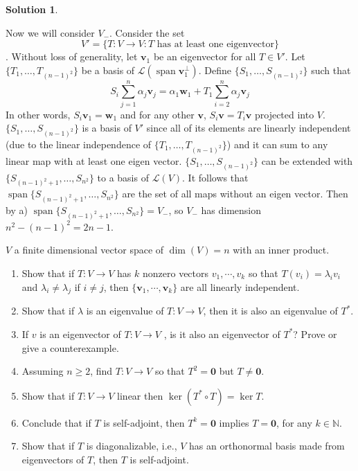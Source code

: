 \documentclass[11pt]{article}
\theoremstyle{definition}
\newenvironment{customex}[1]
  {\renewcommand\theinnercustomex{#1}\innercustomex}
  {\endinnercustomex}
\newtheorem*{solution}{Solution}
\newcommand{\N}{\mathbb{N}}
\DeclareMathOperator{\spn}{span}
\newcommand{\vv}{\mathbf{v}}
\newcommand{\vw}{\mathbf{w}}
\newcommand{\vzero}{\mathbf{0}}
\newcommand{\Lagr}{\mathcal{L}}
\begin{document}
\begin{solution}
\begin{enumerate}[label = \alph*)]
            Now we will consider $V_-$. Consider the set $$V' = \{T:V \to V: T \text{ has at least one eigenvector} \}$$. Without loss of generality, let $\vv_1$ be an eigenvector for all $T \in V'$. Let $\{T_1, \dots, T_{(n-1)^2}\}$ be a basis of $\Lagr(\spn\vv_1^{\perp})$. Define $\{S_1, \dots, S_{(n-1)^2}\}$ such that $$S_i \sum_{j = 1}^n \alpha_j \vv_j = \alpha_1 \vw_1 + T_1 \sum_{i=2}^n \alpha_j \vv_j$$In other words, $S_i\vv_1 = \vw_1$ and for any other $\vv$, $S_i\vv = T_i\vv$ projected into $V$. $\{S_1, \dots, S_{(n-1)^2}\}$ is a basis of $V'$ since all of its elements are linearly independent (due to the linear independence of $\{T_1, \dots, T_{(n-1)^2}\}$) and it can sum to any linear map with at least one eigen vector. $\{S_1, \dots, S_{(n-1)^2}\}$ can be extended with $\{S_{(n-1)^2 + 1}, \dots, S_{n^2}\}$ to a basis of $\Lagr(V)$. It follows that $\spn \{S_{(n-1)^2 + 1}, \dots, S_{n^2}\}$ are the set of all maps without an eigen vector. Then by a) $\spn \{S_{(n-1)^2 + 1}, \dots, S_{n^2}\} = V_-$, so $V_-$ has dimension $n^2 - (n-1)^2 = 2n-1$.
        \end{enumerate}
    \end{solution}

    \begin{customex}{\textbf{10}}
        $V$ a finite dimensional vector space of $\dim(V) = n$ with an inner product.
        \begin{enumerate}[label = \alph*)]
            \item Show that if $T: V \to V$ has $k$ nonzero vectors $v_1, \cdots, v_k$ so that $T(v_i) = \lambda_iv_i$ and $\lambda_i \neq \lambda_j$ if $i \neq j$, then $\{\vv_1, \cdots, \vv_k\}$ are all linearly independent.
            \item Show that if $\lambda$ is an eigenvalue of $T: V \to V$, then it is also an eigenvalue of $T^*$.
            \item If $v$ is an eigenvector of $T : V\to V$ , is it also an eigenvector of $T^*$? Prove or give a counterexample.
            \item Assuming $n \ge 2$, find $T: V \to V$ so that $T^2 = \vzero$ but $T \neq \vzero$.
            \item Show that if $T : V \to V$ linear then $\ker(T^* \circ T) = \ker T$.
            \item Conclude that if $T$ is self-adjoint, then $T^k = \vzero$ implies $T = \vzero$, for any $k \in \N$.
            \item Show that if $T$ is diagonalizable, i.e., $V$ has an orthonormal basis made from eigenvectors of $T$, then $T$ is self-adjoint.
        \end{enumerate}
    \end{customex}
\end{document}
